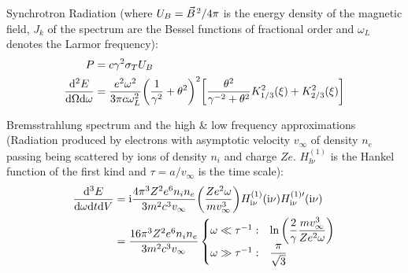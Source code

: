 	\noindent
	Synchrotron Radiation (where $U_B=\pvec{B}^2/4\pi$ is the energy density of the magnetic field, $J_k$ of the spectrum are the Bessel functions of fractional order and $\omega_L$ denotes the Larmor frequency):
	\begin{equation}
		\begin{aligned}
			P &= c \gamma^2 \sigma_T U_B \\
			\frac{\dd^2 E}{\dd\Omega\dd\omega} &= \frac{e^2 \omega^2}{3\pi c\omega_L^2} \qty(\frac{1}{\gamma^2} + \theta^2)^2\qty[\frac{\theta^2}{\gamma^{-2}+\theta^2} K_{1/3}^2(\xi) + K_{2/3}^2(\xi)]\\ 
		\end{aligned}
	\end{equation}

	\noindent
	Bremsstrahlung spectrum and the high \& low frequency approximations (Radiation produced by electrons with asymptotic velocity $v_\infty$ of density $n_e$ passing being scattered by ions of density $n_i$ and charge $Ze$. $H_{\ii \nu}^{(1)}$ is the Hankel function of the first kind and $\tau=a / v_\infty$ is the time scale):
	\begin{equation}
		\begin{aligned}
			\frac{\dd^3 E}{\dd \omega \dd t \dd V} &= \mathrm{i} \frac{4\pi^3 Z^2 e^6 n_i n_e}{3m^2 c^3 v_\infty}\qty(\frac{Z e^2 \omega}{m v_\infty^3}) H_{\mathrm{i} \nu}^{(1)}(\mathrm{i}\nu) H_{\mathrm{i} \nu}^{(1)\prime}(\mathrm{i}\nu) \\
			&= \frac{16\pi^3 Z^2 e^6 n_i n_e}{3m^2 c^3 v_\infty}
			\begin{cases}
				\omega \ll \tau^{-1}: & \ln\qty(\dfrac{2}{\gamma}\dfrac{m v_{\infty}^3}{Z e^2 \omega}) \\
				\omega \gg \tau^{-1}: & \dfrac{\pi}{\sqrt{3}} \\
			\end{cases}\\
		\end{aligned}
	\end{equation}